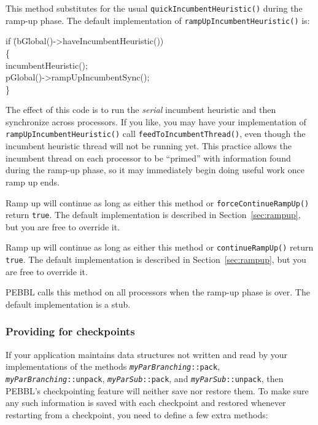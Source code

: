 This method substitutes for the usual
\texttt{quickIncumbentHeuristic()} during the ramp-up phase. The
default implementation of \texttt{rampUpIncumbentHeuristic()} is:
\begin{codeblock}
      if \=(bG\=lobal()->haveIncumbentHeuristic()) \\
\>	\{ \\
\>\>	  incumbentHeuristic(); \\
\>\>	  pGlobal()->rampUpIncumbentSync();\\
\>      \}
\end{codeblock}
The effect of this code is to run the \emph{serial} incumbent
heuristic and then synchronize across processors.  If you
like, you may have your implementation of
\texttt{rampUpIncumbentHeuristic()} call
\texttt{feedToIncumbentThread()}, even though the incumbent heuristic
thread will not be running yet.  This practice allows the incumbent
thread on each processor to be ``primed'' with information found
during the ramp-up phase, so it may immediately begin doing useful
work once ramp up ends.

Ramp up will
continue as long as either this method or
\texttt{forceContinueRampUp()} return \texttt{true}.  The default
implementation is described in Section~\ref{sec:rampup}, but you are
free to override it.

Ramp up will
continue as long as either this method or
\texttt{continueRampUp()} return \texttt{true}.  The default
implementation is described in Section~\ref{sec:rampup}, but you are
free to override it.

PEBBL calls this method on all processors when the ramp-up phase is
over.  The default implementation is a stub.


\subsubsection{Providing for checkpoints}
If your application maintains data structures not written and read by
your implementations of the methods
\texttt{\emph{myParBranching}::\linebreak[0]pack},
\texttt{\emph{myParBranching}::\linebreak[0]unpack},
\texttt{\emph{myParSub}::\linebreak[0]pack}, and
\texttt{\emph{myParSub}::\linebreak[0]unpack}, then PEBBL's
checkpointing feature will neither save nor restore them.  To make
sure any such information is saved with each checkpoint and restored
whenever restarting from a checkpoint, 
you need to define a few extra methods:

